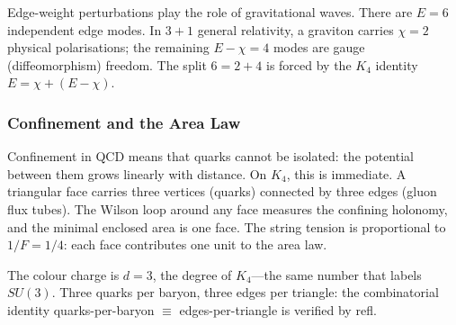 \documentclass[11pt,a4paper]{book}
\def\mathrm#1{#1}%
\def\texttt#1{#1}%
\begin{document}
Edge-weight perturbations play the role of gravitational waves.  There
are $E = 6$ independent edge modes.  In $3+1$ general relativity, a
graviton carries $\chi = 2$ physical polarisations; the remaining
$E - \chi = 4$ modes are gauge (diffeomorphism) freedom.  The split
$6 = 2 + 4$ is forced by the $K_4$ identity $E = \chi + (E - \chi)$.


\subsubsection*{Confinement and the Area Law}

Confinement in QCD means that quarks cannot be isolated: the potential
between them grows linearly with distance.  On $K_4$, this is immediate.
A triangular face carries three vertices (quarks) connected by three
edges (gluon flux tubes).  The Wilson loop around any face measures
the confining holonomy, and the minimal enclosed area is one face.
The string tension is proportional to $1/F = 1/4$: each face contributes
one unit to the area law.

The colour charge is $d = 3$, the degree of $K_4$---the same number
that labels $\mathrm{SU}(3)$.  Three quarks per baryon, three edges per
triangle: the combinatorial identity \texttt{quarks-per-baryon $\equiv$
edges-per-triangle} is verified by \texttt{refl}.
\end{document}
